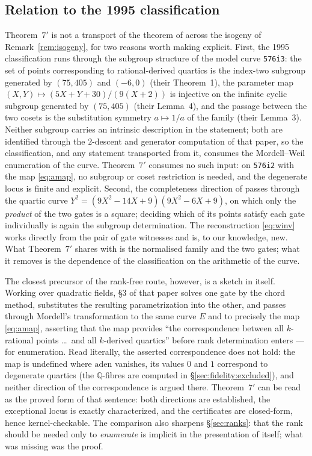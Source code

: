 \documentclass[11pt]{amsart}
\newcommand{\Q}{\mathbb{Q}}
\begin{document}
\subsection{Relation to the 1995 classification}\label{sec:repair:bk}

Theorem~$7'$ is not a transport of the theorem of \cite{BK1995} across
the isogeny of Remark~\ref{rem:isogeny}, for two reasons worth making
explicit.  First, the 1995 classification runs through the subgroup
structure of the model curve \texttt{576i3}: the set of points
corresponding to rational-derived quartics is the index-two subgroup
generated by $(75,405)$ and $(-6,0)$ (their Theorem~1), the parameter
map $(X,Y) \mapsto (5X+Y+30)/(9(X+2))$ is injective on the infinite
cyclic subgroup generated by $(75,405)$ (their Lemma~4), and the
passage between the two cosets is the substitution symmetry
$a \mapsto 1/a$ of the family (their Lemma~3).  Neither subgroup
carries an intrinsic description in the statement; both are identified
through the $2$-descent and generator computation of that paper, so the
classification, and any statement transported from it, consumes the
Mordell--Weil enumeration of the curve.  Theorem~$7'$ consumes no such
input: on \texttt{576i2} with the map \eqref{eq:amap}, no subgroup or
coset restriction is needed, and the degenerate locus is finite and
explicit.  Second, the completeness direction of \cite{BK1995} passes
through the quartic curve $Y^2 = (9X^2-14X+9)(9X^2-6X+9)$, on which
only the \emph{product} of the two gates is a square; deciding which of
its points satisfy each gate individually is again the subgroup
determination.  The reconstruction \eqref{eq:winv} works directly from
the pair of gate witnesses and is, to our knowledge, new.  What
Theorem~$7'$ shares with \cite{BK1995} is the normalised family and the
two gates; what it removes is the dependence of the classification on
the arithmetic of the curve.

The closest precursor of the rank-free route, however, is a sketch in
\cite{BM2000} itself.  Working over quadratic fields, \S3 of that
paper solves one gate by the chord method, substitutes the resulting
parametrization into the other, and passes through Mordell's
transformation to the same curve $E$ and to precisely the map
\eqref{eq:amap}, asserting that the map provides ``the correspondence
between all $k$-rational points \dots\ and all $k$-derived quartics''
before rank determination enters --- for enumeration.  Read literally,
the asserted correspondence does not hold: the map is undefined where
$\mathrm{aden}$ vanishes, its values $0$ and $1$ correspond to
degenerate quartics (the $\Q$-fibres are computed in
\S\ref{sec:fidelity:excluded}), and neither direction of the correspondence
is argued there.  Theorem~$7'$ can be read as the proved form of that
sentence: both directions are established, the exceptional locus is
exactly characterized, and the certificates are closed-form, hence
kernel-checkable.  The comparison also sharpens \S\ref{sec:ranks}:
that the rank should be needed only to \emph{enumerate} is implicit in
the presentation of \cite{BM2000} itself; what was missing was the
proof.
\end{document}

